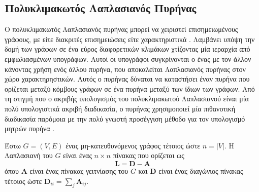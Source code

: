 \subsection{Πολυκλιμακωτός Λαπλασιανός Πυρήνας}
\label{ssec:ml}
Ο πολυκλιμακωτός Λαπλασιανός πυρήνας μπορεί να χειριστεί επισημειωμένους γράφους, με είτε διακριτές επισημειώσεις είτε χαρακτηριστικά \cite{kondor2016multiscale}.
Λαμβάνει υπόψη την δομή των γράφων σε ένα εύρος διαφορετικών κλιμάκων χτίζοντας μία ιεραρχία από εμφωλιασμένων υπογράφων.
Αυτοί οι υπογράφοι συγκρίνονται ο ένας με τον άλλον κάνοντας χρήση ενός άλλου πυρήνα, που αποκαλείται Λαπλασιανός πυρήνας στον χώρο χαρακτηρηστικών.
Αυτός ο πυρήνας δύναται να καταστήσει έναν πυρήνα που ορίζεται μεταξύ κόμβους γράφων σε ένα πυρήνα μεταξύ των ίδιων των γράφων.
Από τη στιγμή που ο ακριβής υπολογισμός του πολυκλιμακωτού Λαπλασιανού είναι μία πολύ υπολογιστικά ακριβή διαδικασία, ο πυρήνας χρησιμοποιεί μία πιθανοτική διαδικασία παρόμοια με την πολύ γνωστή προσέγγιση μέθοδο  για τον υπολογισμό μητρών πυρήνα \cite{williams2001using}.

Έστω $G=(V,E)$ ένας μη-κατευθυνόμενος γράφος τέτοιος ώστε $n = |V|$.
Η Λαπλασιανή του $G$ είναι ένας $n \times n$ πίνακας που ορίζεται ως
\begin{equation*}
    \mathbf{L} = \mathbf{D} - \mathbf{A} 
\end{equation*}
όπου $\mathbf{A}$ είναι ένας πίνακας γειτνίασης του $G$ και $\mathbf{D}$ είναι ένας διαγώνιος πίνακας τέτοιος ώστε $\mathbf{D}_{ii} = \sum_j \mathbf{A}_{ij}$.

